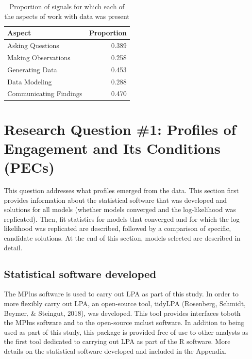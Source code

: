 \documentclass[]{book}
\theoremstyle{definition}
\theoremstyle{definition}
\theoremstyle{definition}
\theoremstyle{remark}
\begin{document}
\begin{table}

\caption{\label{tab:unnamed-chunk-9}Proportion of signals for which each of the aspects of work with data was present}
\centering
\begin{tabular}[t]{lr}
\toprule
Aspect & Proportion\\
\midrule
Asking Questions & 0.389\\
Making Observations & 0.258\\
Generating Data & 0.453\\
Data Modeling & 0.288\\
Communicating Findings & 0.470\\
\bottomrule
\end{tabular}
\end{table}

\section{Research Question \#1: Profiles of Engagement and Its
Conditions
(PECs)}\label{research-question-1-profiles-of-engagement-and-its-conditions-pecs}

This question addresses what profiles emerged from the data. This
section first provides information about the statistical software that
was developed and solutions for all models (whether models converged and
the log-likelihood was replicated). Then, fit statistics for models that
converged and for which the log-likelihood was replicated are described,
followed by a comparison of specific, candidate solutions. At the end of
this section, models selected are described in detail.

\subsection{Statistical software
developed}\label{statistical-software-developed}

The MPlus software is used to carry out LPA as part of this study. In
order to more flexibly carry out LPA, an open-source tool, tidyLPA
(Rosenberg, Schmidt, Beymer, \& Steingut, 2018), was developed. This
tool provides interfaces toboth the MPlus software and to the
open-source mclust software. In addition to being used as part of this
study, this package is provided free of use to other analysts as the
first tool dedicated to carrying out LPA as part of the R software. More
details on the statistical software developed and included in the
Appendix.
\end{document}
